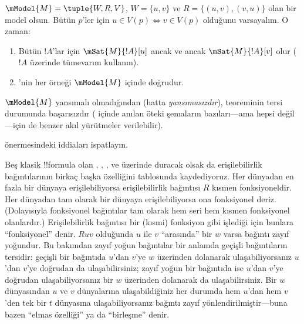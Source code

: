 \begin{prop}
  $\mModel{M}=\tuple{W,R,V}$, $W=\{u,v\}$ ve
  $R=\{(u,v),(v,u)\}$ olan bir model olsun.
  Bütün $p$'ler için $u\in V(p)\Leftrightarrow v\in V(p)$ olduğunu
  varsayalım. O zaman:
  \begin{enumerate}
  \item Bütün $!A$'lar için $\mSat{M}{!A}[u]$ ancak ve ancak
    $\mSat{M}{!A}[v]$ olur ($!A$ üzerinde tümevarım kullanın).
  \item {}'nin her örneği $\mModel{M}$ içinde doğrudur.
  \end{enumerate}
  $\mModel{M}$ yansımalı olmadığından (hatta \emph{yansımasızdır}),
   teoreminin tersi  durumunda başarısızdır
  ( içinde anılan öteki şemaların bazıları---ama
  hepsi değil---için de benzer akıl yürütmeler verilebilir).
\end{prop}

\begin{prob}
   önermesindeki iddiaları ispatlayın.
\end{prob}

Beş klasik !!{formula} olan , , ,  ve 
üzerinde duracak olsak da erişilebilirlik bağıntılarının birkaç başka
özelliğini  tablosunda kaydediyoruz. Her dünyadan en
fazla bir dünyaya erişilebiliyorsa erişilebilirlik bağıntısı $R$
kısmen fonksiyoneldir. Her dünyadan tam olarak bir dünyaya erişilebiliyorsa
ona fonksiyonel deriz. (Dolayısıyla fonksiyonel bağıntılar tam olarak hem
seri hem kısmen fonksiyonel olanlardır.) Erişilebilirlik bağıntısı bir
(kısmi) fonksiyon gibi işlediği için bunlara ``fonksiyonel'' denir. $Ruv$
olduğunda $u$ ile $v$ ``arasında'' bir $w$ varsa bağıntı zayıf yoğundur.
Bu bakımdan zayıf yoğun bağıntılar bir anlamda geçişli bağıntıların tersidir:
geçişli bir bağıntıda $u$'dan $v$'ye $w$ üzerinden dolanarak
ulaşabiliyorsanız $u$'dan $v$'ye doğrudan da ulaşabilirsiniz; zayıf yoğun
bir bağıntıda ise $u$'dan $v$'ye doğrudan ulaşabiliyorsanız bir $w$
üzerinden dolanarak da ulaşabilirsiniz. Bir $w$ dünyasından $u$ ve $v$
dünyalarına ulaşabildiğiniz her durumda hem $u$'dan hem $v$'den tek bir $t$
dünyasına ulaşabiliyorsanız bağıntı zayıf yönlendirilmiştir---buna bazen
``elmas özelliği'' ya da ``birleşme'' denir.

